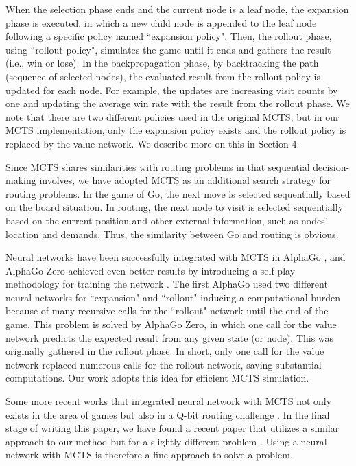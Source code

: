 \documentclass{article}
\newcommand\HWG[1]{ {\color{blue}#1} }
\begin{document}
When the selection phase ends and the current node is a leaf node, the expansion phase is executed, in which a new child node is appended to the leaf node following a specific policy named ``expansion policy". Then, the rollout phase, using ``rollout policy", simulates the game until it ends and gathers the result (i.e., win or lose). In the backpropagation phase, by backtracking the path (sequence of selected nodes), the evaluated result from the rollout policy is updated for each node. For example, the updates are increasing visit counts by one and updating the average win rate with the result from the rollout phase. We note that there are two different policies used in the original MCTS, but in our MCTS implementation, only the expansion policy exists and the rollout policy is replaced by the value network. We describe more on this in Section 4. %

Since MCTS shares similarities with routing problems in that sequential decision-making involves, we have adopted MCTS as an additional search strategy for routing problems. In the game of Go, the next move is selected sequentially based on the board situation. In routing, the next node to visit is selected sequentially based on the current position and other external information, such as nodes' location and demands. Thus, the similarity between Go and routing is obvious.

Neural networks have been successfully integrated with MCTS in AlphaGo \cite{silverMasteringGameGo2016}, and AlphaGo Zero achieved even better results by introducing a self-play methodology for training the network \cite{silverMasteringGameGo2017}. The first AlphaGo used two different neural networks for ``expansion" and ``rollout" inducing a computational burden because of many recursive calls for the ``rollout" network until the end of the game. This problem is solved by AlphaGo Zero, in which one call for the value network predicts the expected result from any given state (or node). This was originally gathered in the rollout phase. In short, only one call for the value network replaced numerous calls for the rollout network, saving substantial computations. Our work adopts this idea for efficient MCTS simulation.

Some more recent works that integrated neural network with MCTS not only exists in the area of games but also in a Q-bit routing challenge \cite{QubitRouting_with_MCTS}. In the final stage of writing this paper, we have found a recent paper that utilizes a similar approach to our method but for a slightly different problem \cite{AlphaRouter_AAAI}. Using a neural network with MCTS is therefore a fine approach to solve a problem.
\end{document}
